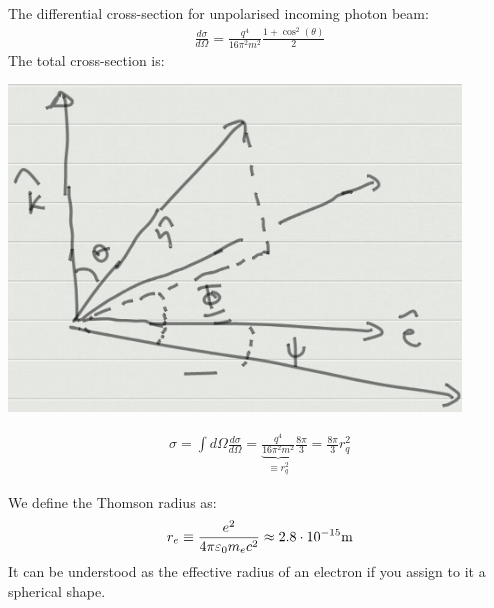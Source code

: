 \begin{minipage}{0.3\textwidth}
    The differential cross-section for unpolarised incoming photon beam:
\begin{align*}
    \frac{d \sigma}{d \Omega}
    = \frac{q^4}{16 \pi^2 m^2} \frac{1 + \cos^2(\theta)}{2}
\end{align*}
The total cross-section is:
\end{minipage}\begin{minipage}{0.2\textwidth}
    \centering
    \includegraphics[width=0.9\textwidth]{Pictures/Scattering.png}
\end{minipage}


\begin{align*}
    \sigma = \int d \Omega \frac{d \sigma}{d \Omega}
    = \underbrace{\frac{q^4}{16 \pi^2 m^2}}_{\equiv r_q^2} \frac{8 \pi}{3}
    = \frac{8 \pi}{3} r_q^2
\end{align*}

We define the Thomson radius as:
\begin{align*}
    r_e \equiv \frac{e^2}{4 \pi \varepsilon_0 m_e c^2} \approx 2.8 \cdot 10^{-15} \mathrm{m}
\end{align*}
It can be understood as the effective radius of an electron if you assign to it
a spherical shape.


